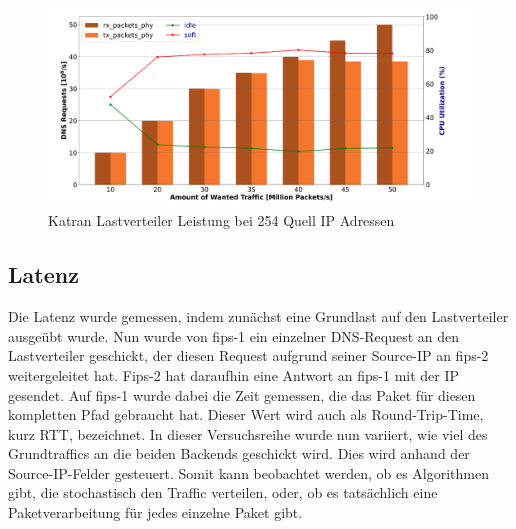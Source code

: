 \begin{figure}
    \centering
    \includegraphics[width=1\linewidth]{images/katran_performance.png}
    \caption{Katran Lastverteiler Leistung bei 254 Quell IP Adressen \cite{ungrund}}
    \label{fig:enter-label}
\end{figure}
\subsection{Latenz}
Die Latenz wurde gemessen, indem zunächst eine Grundlast auf den Lastverteiler ausgeübt wurde. Nun wurde von fips-1 ein einzelner DNS-Request an den Lastverteiler geschickt, der diesen Request aufgrund seiner Source-IP an fips-2 weitergeleitet hat. Fips-2 hat daraufhin eine Antwort an fips-1 mit der IP gesendet. Auf fips-1 wurde dabei die Zeit gemessen, die das Paket für diesen kompletten Pfad gebraucht hat. Dieser Wert wird auch als Round-Trip-Time, kurz RTT, bezeichnet. In dieser Versuchsreihe wurde nun variiert, wie viel des Grundtraffics an die beiden Backends geschickt wird. Dies wird anhand der Source-IP-Felder gesteuert. Somit kann beobachtet werden, ob es Algorithmen gibt, die stochastisch den Traffic verteilen, oder, ob es tatsächlich eine Paketverarbeitung für jedes einzelne Paket gibt.

